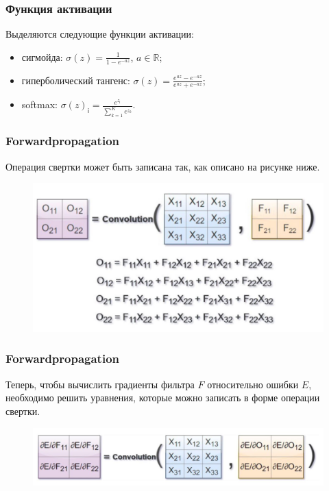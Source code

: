 \documentclass[unicode,9pt, pdf]{beamer}
\begin{document}
\begin{frame}
	\frametitle{Функция активации}
	 Выделяются следующие функции активации:
		\begin{itemize}
			\item сигмойда: $\sigma(z) = \frac{1}{1 - e^{-az}}$, $a \in \mathbb{R}$;
			\item гиперболический тангенс: $\sigma(z) = \frac{e^{az} - e^{-az}}{e^{az} + e^{-az}}$;
			\item softmax: $\sigma(z)_{\mathsf{i}} = \frac{e^{z_{\mathsf{i}}}}{\sum \limits_{k=1}^{K} e^{z_{k}} }$.
		\end{itemize}
	
\end{frame}

	\begin{frame}
		\frametitle{Forwardpropagation}
		Операция свертки может быть записана так, как описано на рисунке ниже.
		\begin{figure}[h]
			\begin{center}
				\begin{minipage}[h]{0.92\linewidth}
					\includegraphics[width=1\linewidth]{cnn4.JPG}
				\end{minipage}
			\end{center}
		\end{figure}

	\end{frame}

	\begin{frame}
		\frametitle{Forwardpropagation}
		Теперь, чтобы вычислить градиенты фильтра $F$ относительно ошибки $E$, необходимо решить уравнения, которые можно записать в форме операции свертки.

		\begin{figure}[h]
			\begin{center}
				\begin{minipage}[h]{0.92\linewidth}
					\includegraphics[width=1\linewidth]{cnn5.JPG}
				\end{minipage}
			\end{center}
		\end{figure}
	\end{frame}
\end{document}
